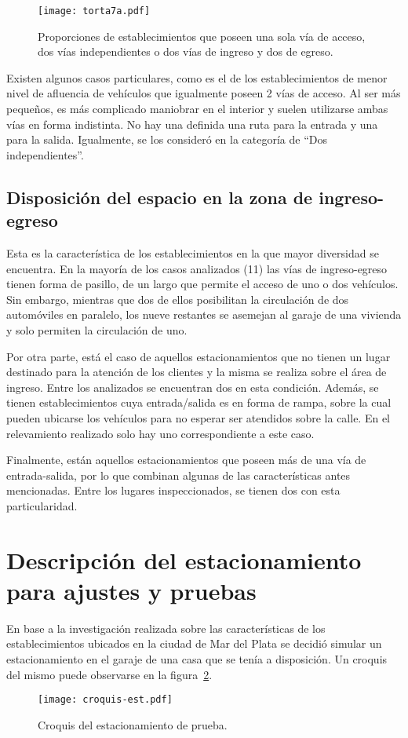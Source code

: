 \begin{figure}[htb]
	\centering
	\texttt{[image: torta7a.pdf]}
	\caption{Proporciones de establecimientos que poseen una sola vía de acceso, dos vías independientes o dos vías de ingreso y dos de egreso.}
	\label{fig:img_torta7a}
\end{figure}


Existen algunos casos particulares, como es el de los establecimientos de menor nivel de afluencia de vehículos que igualmente poseen 2 vías de acceso. Al ser más pequeños, es más complicado maniobrar en el interior y suelen utilizarse ambas vías en forma indistinta. No hay una definida una ruta para la entrada y una para la salida. Igualmente, se los consideró en la categoría de “Dos independientes”. 

\subsection{Disposición del espacio en la zona de ingreso-egreso}

Esta es la característica de los establecimientos en la que mayor diversidad se encuentra. En la mayoría de los casos analizados (11) las vías de ingreso-egreso tienen forma de pasillo, de un largo que permite el acceso de uno o dos vehículos. Sin embargo, mientras que dos de ellos posibilitan la circulación de dos automóviles en paralelo, los nueve restantes se asemejan al garaje de una vivienda y solo permiten la circulación de uno. 

Por otra parte, está el caso de aquellos estacionamientos que no tienen un lugar destinado para la atención de los clientes y la misma se realiza sobre el área de ingreso. Entre los analizados se encuentran dos en esta condición. Además, se tienen establecimientos cuya entrada/salida es en forma de rampa, sobre la cual pueden ubicarse los vehículos para no esperar ser atendidos sobre la calle. En el relevamiento realizado solo hay uno correspondiente a este caso.

Finalmente, están aquellos estacionamientos que poseen más de una vía de entrada-salida, por lo que combinan algunas de las características antes mencionadas. Entre los lugares inspeccionados, se tienen dos con esta particularidad.

\section{Descripción del estacionamiento para ajustes y pruebas   }\label{key:estprotot}
En base a la investigación realizada sobre las características de los establecimientos ubicados en la ciudad de Mar del Plata se decidió simular un estacionamiento en el garaje de una casa que se tenía a disposición. Un croquis del mismo puede observarse en la figura~\ref{fig:img_croquis}.
\begin{figure}[H]
	\centering
	\texttt{[image: croquis-est.pdf]}
	\caption{Croquis del estacionamiento de prueba.}
	\label{fig:img_croquis}
\end{figure}

